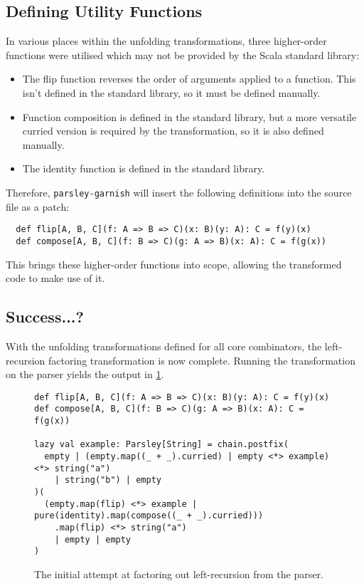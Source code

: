 \documentclass[../../main.tex]{subfiles}
\begin{document}
\subsection{Defining Utility Functions}
In various places within the unfolding transformations, three higher-order functions were utilised which may not be provided by the Scala standard library:
\begin{itemize}
  \item The flip function reverses the order of arguments applied to a function. This isn't defined in the standard library, so it must be defined manually.
  \item Function composition is defined in the standard library, but a more versatile curried version is required by the transformation, so it is also defined manually.
  \item The identity function  is defined in the standard library.
\end{itemize}
%
Therefore, \texttt{parsley-garnish} will insert the following definitions into the source file as a patch:
\begin{verbatim}
  def flip[A, B, C](f: A => B => C)(x: B)(y: A): C = f(y)(x)
  def compose[A, B, C](f: B => C)(g: A => B)(x: A): C = f(g(x))
\end{verbatim}
%
This brings these higher-order functions into scope, allowing the transformed code to make use of it.

\subsection*{Success...?}
With the unfolding transformations defined for all core combinators, the left-recursion factoring transformation is now complete.
Running the transformation on the  parser yields the output in \cref{fig:leftrec-example-bad}.
%
\begin{figure}[htbp]
\begin{verbatim}
def flip[A, B, C](f: A => B => C)(x: B)(y: A): C = f(y)(x)
def compose[A, B, C](f: B => C)(g: A => B)(x: A): C = f(g(x))

lazy val example: Parsley[String] = chain.postfix(
  empty | (empty.map((_ + _).curried) | empty <*> example) <*> string("a")
    | string("b") | empty
)(
  (empty.map(flip) <*> example | pure(identity).map(compose((_ + _).curried)))
    .map(flip) <*> string("a")
    | empty | empty
)
\end{verbatim}
\caption{The initial attempt at factoring out left-recursion from the  parser.}
\label{fig:leftrec-example-bad}
\end{figure}
\end{document}
